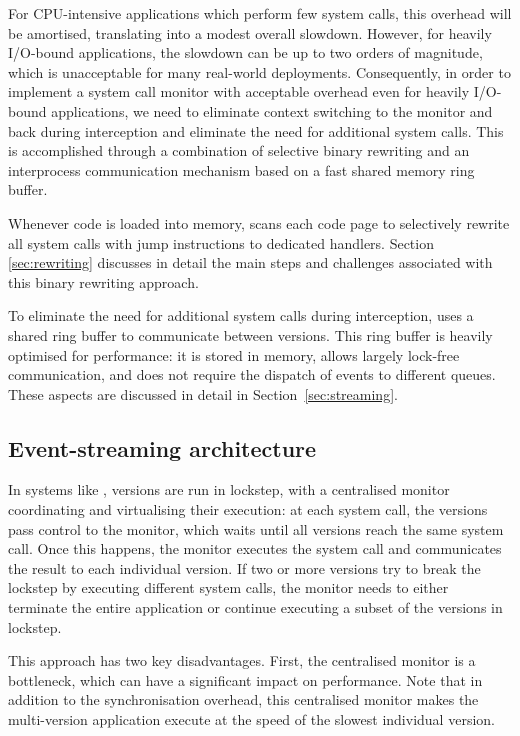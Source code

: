 For CPU-intensive applications which perform few system calls, this
overhead will be amortised, translating into a modest overall
slowdown.  However, for heavily I/O-bound applications, the slowdown
can be up to two orders of magnitude, which is unacceptable for many
real-world deployments.
%
Consequently, in order to implement a system call monitor with
acceptable overhead even for heavily I/O-bound applications, we need
to eliminate context switching to the monitor and back during
interception and eliminate the need for additional system calls.  
This is accomplished through a combination of selective binary
rewriting and an interprocess communication mechanism based on a
fast shared memory ring buffer.

Whenever code is loaded into memory, \varan scans each code page to
selectively rewrite all system calls with jump instructions to dedicated
handlers.  Section \ref{sec:rewriting} discusses in detail the main
steps and challenges associated with this binary rewriting approach.

To eliminate the need for additional system calls during interception,
\varan uses a shared ring buffer to communicate between versions.  This
ring buffer is heavily optimised for performance: it is stored in
memory, allows largely lock-free communication, and does not require
the dispatch of events to different queues.  These aspects are
discussed in detail in Section~\ref{sec:streaming}.



\subsection{Event-streaming architecture}
\label{sec:coordination}

In systems like \mx, versions are run in lockstep, with a centralised monitor
coordinating and virtualising their execution: at each system call, the
versions pass control to the monitor, which waits until all versions reach the
same system call.  Once this happens, the monitor executes the system call and
communicates the result to each individual version.  If two or more versions
try to break the lockstep by executing different system calls, the monitor
needs to either terminate the entire application or continue executing a subset
of the versions in lockstep.

This approach has two key disadvantages.  First, the centralised
monitor is a bottleneck, which can have a significant impact on
performance.  Note that in addition to the synchronisation overhead,
this centralised monitor makes the multi-version application execute at the
speed of the slowest individual version.

